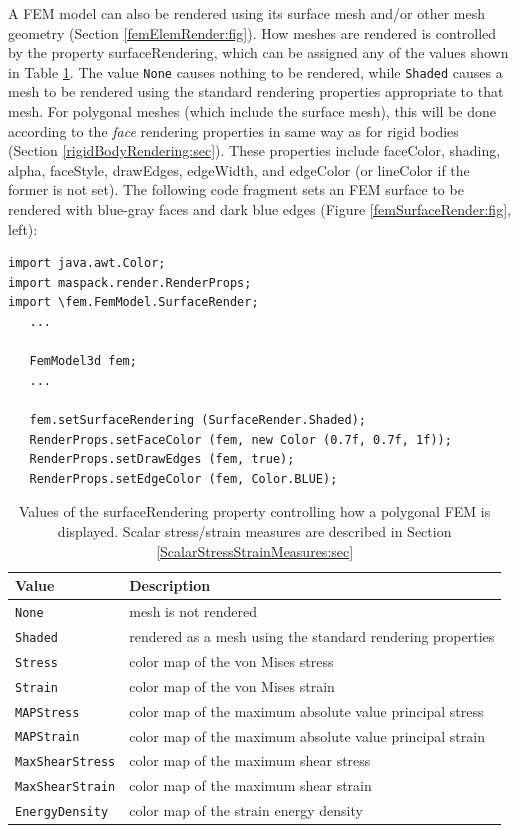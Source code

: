 A FEM model can also be rendered using its surface mesh and/or other
mesh geometry (Section \ref{femElemRender:fig}). How meshes are
rendered is controlled by the property {\sf surfaceRendering}, which
can be assigned any of the values shown in
Table \ref{surfaceRendering:tab}. The value {\tt None} causes nothing
to be rendered, while {\tt Shaded} causes a mesh to be rendered using
the standard rendering properties appropriate to that mesh. For
polygonal meshes (which include the surface mesh), this will be done
according to the {\it face} rendering properties in same way as for
rigid bodies (Section \ref{rigidBodyRendering:sec}). These properties
include {\sf faceColor}, {\sf shading}, {\sf alpha}, {\sf faceStyle},
{\sf drawEdges}, {\sf edgeWidth}, and {\sf edgeColor} (or {\sf
lineColor} if the former is not set). The following code
fragment sets an FEM surface to be rendered with blue-gray
faces and dark blue edges (Figure \ref{femSurfaceRender:fig}, left):
\pdfbreak
%
\begin{lstlisting}[]
import java.awt.Color;
import maspack.render.RenderProps;
import \fem.FemModel.SurfaceRender;
   ...

   FemModel3d fem;
   ...

   fem.setSurfaceRendering (SurfaceRender.Shaded);
   RenderProps.setFaceColor (fem, new Color (0.7f, 0.7f, 1f));
   RenderProps.setDrawEdges (fem, true);
   RenderProps.setEdgeColor (fem, Color.BLUE);
\end{lstlisting}
%
\begin{table}[ht]
\caption{Values of the {\sf surfaceRendering} property
controlling how a polygonal FEM is displayed. Scalar stress/strain
measures are described in
Section \ref{ScalarStressStrainMeasures:sec}}
\begin{center}
\begin{tabular}{ll}
\hline
Value & Description\\
\hline
{\tt None} & mesh is not rendered\\
{\tt Shaded} & rendered as a mesh using the standard rendering properties\\
{\tt Stress} & color map of the von Mises stress\\
{\tt Strain} & color map of the von Mises strain\\
{\tt MAPStress} & color map of the maximum absolute value principal stress\\
{\tt MAPStrain} & color map of the maximum absolute value principal strain\\
{\tt MaxShearStress} & color map of the maximum shear stress\\
{\tt MaxShearStrain} & color map of the maximum shear strain\\
{\tt EnergyDensity} & color map of the strain energy density\\
\hline
\end{tabular}
\end{center}
\label{surfaceRendering:tab}
\end{table}

